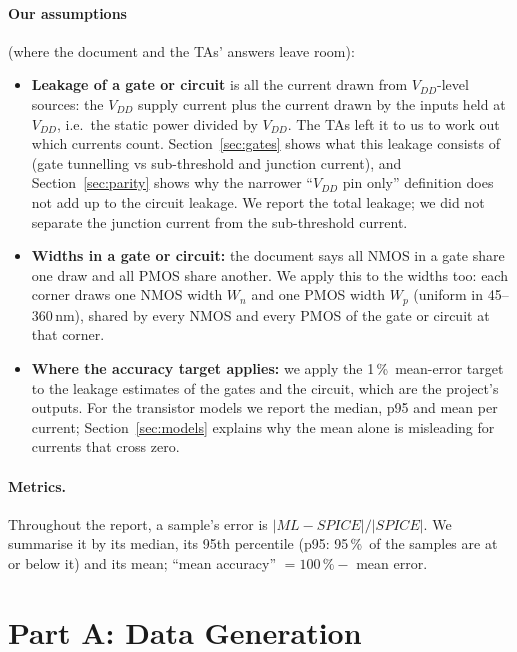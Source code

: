 \documentclass[11pt,a4paper]{article}
\newcommand{\pct}{\,\%}
\begin{document}
\paragraph{Our assumptions} (where the document and the TAs' answers leave room):
\begin{itemize}
    \item \textbf{Leakage of a gate or circuit} is all the current drawn from $V_{DD}$-level sources:
    the $V_{DD}$ supply current plus the current drawn by the inputs held at $V_{DD}$, i.e.\ the
    static power divided by $V_{DD}$. The TAs left it to us to work out which currents count.
    Section~\ref{sec:gates} shows what this leakage consists of (gate tunnelling vs sub-threshold and
    junction current), and Section~\ref{sec:parity} shows why the narrower ``$V_{DD}$ pin only''
    definition does not add up to the circuit leakage. We report the total leakage; we did not
    separate the junction current from the sub-threshold current.
    \item \textbf{Widths in a gate or circuit:} the document says all NMOS in a gate share one draw
    and all PMOS share another. We apply this to the widths too: each corner draws one NMOS width
    $W_n$ and one PMOS width $W_p$ (uniform in 45--360\,nm), shared by every NMOS and every PMOS of
    the gate or circuit at that corner.
    \item \textbf{Where the accuracy target applies:} we apply the 1\pct\ mean-error target to the
    leakage estimates of the gates and the circuit, which are the project's outputs. For the
    transistor models we report the median, p95 and mean per current; Section~\ref{sec:models}
    explains why the mean alone is misleading for currents that cross zero.
\end{itemize}

\paragraph{Metrics.} Throughout the report, a sample's error is $|ML - SPICE| / |SPICE|$. We
summarise it by its median, its 95th percentile (p95: 95\pct\ of the samples are at or below it) and
its mean; ``mean accuracy'' $= 100\pct - $ mean error.

\section{Part A: Data Generation}
\label{sec:data}
\end{document}
